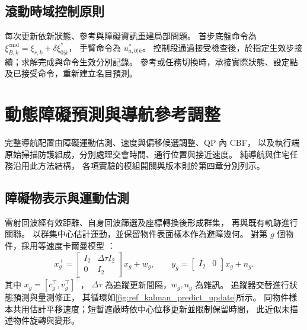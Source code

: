 \subsection{滾動時域控制原則}
\label{subsec:wholebody_receding_horizon}

每次更新依新狀態、參考與障礙資訊重建局部問題。
首步底盤命令為 $\xi_{B,k}^{\mathrm{cmd}}=\xi_{r,k}+\delta\xi_{0|k}^{*}$，
手臂命令為 $u_{a,0|k}^{*}$。
控制段通過接受檢查後，於指定生效步接續；求解完成與命令生效分別記錄。
參考或任務切換時，承接實際狀態、設定點及已接受命令，重新建立名目預測。

\section{動態障礙預測與導航參考調整}
\label{sec:dynamic_obstacle_avoidance}

完整導航配置由障礙運動估測、速度與偏移候選調整、QP 內 CBF，
以及執行端原始掃描防護組成，分別處理交會時間、通行位置與接近速度。
純導航與住宅任務沿用此方法結構，
各項實驗的模組開關與版本則於第四章分別列示。

\subsection{障礙物表示與運動估測}
\label{subsec:obstacle_representation_prediction}

雷射回波經有效距離、自身回波篩選及座標轉換後形成群集，
再與既有軌跡進行關聯。
以群集中心估計運動，並保留物件表面樣本作為避障幾何。
對第 $g$ 個物件，採用等速度卡爾曼模型
\cite{kalman1960filter}：
\begin{equation}
    x_g^+=
    \begin{bmatrix}I_2&\Delta\tau I_2\\0&I_2\end{bmatrix}x_g+w_g,
    \qquad
    y_g=\begin{bmatrix}I_2&0\end{bmatrix}x_g+n_g .
    \label{eq:ch3_obstacle_tracking_model}
\end{equation}
其中 $x_g=[c_g^\top,v_g^\top]^\top$，
$\Delta\tau$ 為追蹤更新間隔，$w_g,n_g$ 為雜訊。
追蹤器交替進行狀態預測與量測修正\cite{welch2004kalman}，
其循環如\cref{fig:ref_kalman_predict_update}所示。
同物件樣本共用估計平移速度；短暫遮蔽時依中心位移更新並限制保留時間，
此近似未描述物件旋轉與變形。

